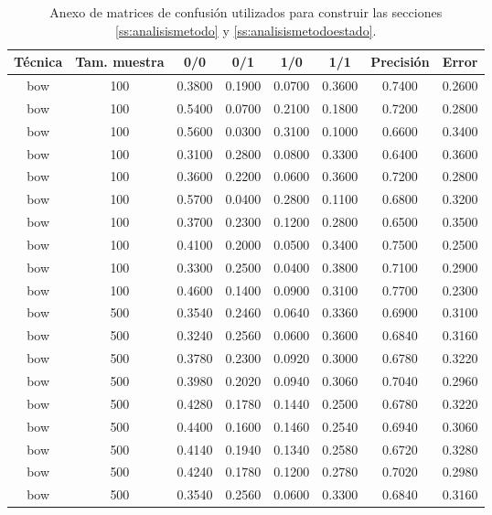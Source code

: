 \begin{scriptsize}
	\begin{longtable}{cccccccc}
		\caption{Anexo de matrices de confusión utilizados para construir las secciones \ref{ss:analisismetodo} y \ref{ss:analisismetodoestado}.} \\
		\toprule
		\textbf{Técnica} & \textbf{Tam. muestra} & \textbf{0/0} & \textbf{0/1} & \textbf{1/0} & \textbf{1/1} & \textbf{Precisión} & \textbf{Error}\\
		\midrule
		\endhead
		bow      & 100  & 0.3800 & 0.1900 & 0.0700 & 0.3600 & 0.7400 & 0.2600 \\
		bow      & 100  & 0.5400 & 0.0700 & 0.2100 & 0.1800 & 0.7200 & 0.2800 \\
		bow      & 100  & 0.5600 & 0.0300 & 0.3100 & 0.1000 & 0.6600 & 0.3400 \\
		bow      & 100  & 0.3100 & 0.2800 & 0.0800 & 0.3300 & 0.6400 & 0.3600 \\
		bow      & 100  & 0.3600 & 0.2200 & 0.0600 & 0.3600 & 0.7200 & 0.2800 \\
		bow      & 100  & 0.5700 & 0.0400 & 0.2800 & 0.1100 & 0.6800 & 0.3200 \\
		bow      & 100  & 0.3700 & 0.2300 & 0.1200 & 0.2800 & 0.6500 & 0.3500 \\
		bow      & 100  & 0.4100 & 0.2000 & 0.0500 & 0.3400 & 0.7500 & 0.2500 \\
		bow      & 100  & 0.3300 & 0.2500 & 0.0400 & 0.3800 & 0.7100 & 0.2900 \\
		bow      & 100  & 0.4600 & 0.1400 & 0.0900 & 0.3100 & 0.7700 & 0.2300 \\
		bow      & 500  & 0.3540 & 0.2460 & 0.0640 & 0.3360 & 0.6900 & 0.3100 \\
		bow      & 500  & 0.3240 & 0.2560 & 0.0600 & 0.3600 & 0.6840 & 0.3160 \\
		bow      & 500  & 0.3780 & 0.2300 & 0.0920 & 0.3000 & 0.6780 & 0.3220 \\
		bow      & 500  & 0.3980 & 0.2020 & 0.0940 & 0.3060 & 0.7040 & 0.2960 \\
		bow      & 500  & 0.4280 & 0.1780 & 0.1440 & 0.2500 & 0.6780 & 0.3220 \\
		bow      & 500  & 0.4400 & 0.1600 & 0.1460 & 0.2540 & 0.6940 & 0.3060 \\
		bow      & 500  & 0.4140 & 0.1940 & 0.1340 & 0.2580 & 0.6720 & 0.3280 \\
		bow      & 500  & 0.4240 & 0.1780 & 0.1200 & 0.2780 & 0.7020 & 0.2980 \\
		bow      & 500  & 0.3540 & 0.2560 & 0.0600 & 0.3300 & 0.6840 & 0.3160 \\

\end{longtable}
\end{scriptsize}
